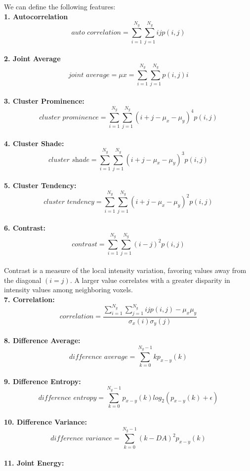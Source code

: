 We can define the following features: \\
\textbf{1. Autocorrelation}\\
\[\textit{auto correlation}=\sum _{i=1}^{N_{g}}\sum _{j=1}^{N_{g}}ijp\left(i,j\right)\]\\
\textbf{2. Joint Average}\\
\[\textit{joint average}=\mu x=\sum _{i=1}^{N_{g}}\sum _{j=1}^{N_{g}}p\left(i,j\right)i\]\\
\textbf{3. Cluster Prominence:}\\
\[\textit{cluster prominence}=\sum _{i=1}^{N_{g}}\sum _{j=1}^{N_{g}}\left(i+j-\mu _{x}-\mu _{y}\right)^{4}p\left(i,j\right)\]\\
\textbf{4. Cluster Shade:}\\
\[\textit{cluster shade}=\sum _{i=1}^{N_{g}}\sum _{j=1}^{N_{g}}\left(i+j-\mu _{x}-\mu _{y}\right)^{3}p\left(i,j\right)\]\\
\textbf{5. Cluster Tendency:}\\
\[\textit{cluster tendency}=\sum _{i=1}^{N_{g}}\sum _{j=1}^{N_{g}}\left(i+j-\mu _{x}-\mu _{y}\right)^{2}p\left(i,j\right)\]\\
\textbf{6. Contrast:}\\
\[\textit{contrast}=\sum _{i=1}^{N_{g}}\sum _{j=1}^{N_{g}}\left(i-j\right)^{2}p\left(i,j\right)\]\\
Contrast is a measure of the local intensity variation, favoring values away from the diagonal $\left(i=j\right)$. A larger value correlates with a greater disparity in intensity values among neighboring voxels.\\
\textbf{7. Correlation:}\\
\[\textit{correlation}=\frac{\sum _{i=1}^{N_{g}}\sum _{j=1}^{N_{g}}ijp\left(i,j\right)-\mu _{x}\mu _{y}}{\sigma _{x}\left(i\right)\sigma _{y}\left(j\right)}\]\\
\textbf{8. Difference Average:}\\
\[\textit{difference average}=\sum _{k=0}^{N_{g}-1}kp_{x-y}\left(k\right)\]\\
\textbf{9. Difference Entropy:}\\
\[\textit{difference entropy}=\sum _{k=0}^{N_{g}-1}p_{x-y}\left(k\right)log_{2}\left(p_{x-y}\left(k\right)+\epsilon \right)\]\\
\textbf{10. Difference Variance:}\\
\[\textit{difference variance}=\sum _{k=0}^{N_{g}-1}{\left(k-DA\right)^{2}}p_{x-y}\left(k\right)\]\\
\textbf{11. Joint Energy:}\\
